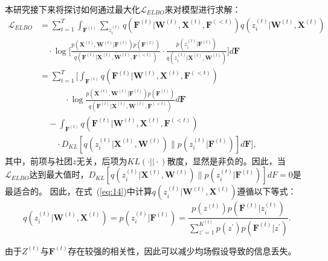 本研究接下来将探讨如何通过最大化$\mathcal{L}_{ELBO}$来对模型进行求解：
\begin{align}
 {\mathcal{L}_{ELBO}} & = \sum_{t=1}^T \int_{\bm{F}^{(t)}} \sum_{z_i^{(t)}} q(\bm{F}^{(t)}|\bm{W}^{(t)},\bm{X}^{(t)},\bm{F}^{(<t)})q(z_i^{(t)}|\bm{W}^{(t)},\bm{X}^{(t)}) \nonumber \\
 & \quad \cdot\log\Bigg[\frac{p(\bm{X}^{(t)}, \bm{W}^{(t)} | \bm{F}^{(t)}) p(\bm{F}^{(t)})}{q(\bm{F}^{(t)}|\bm{X}^{(t)},\bm{W}^{(t)}, \bm{F}^{(< t)})} \cdot\frac{p(z_i^{(t)}|\bm{F}^{(t)})}{q(z_i^{(t)}|\bm{X}^{(t)},\bm{W}^{(t)})} \Bigg]d\bm{F}\nonumber\\
 & = \sum_{t=1}^T \Bigg[\int_{\bm{F}^{(t)}}q(\bm{F}^{(t)}|\bm{W}^{(t)},\bm{X}^{(t)},\bm{F}^{(< t)}) \nonumber \\ 
 & \quad \quad \quad \cdot \log\frac{p(\bm{X}^{(t)}, \bm{W}^{(t)} | \bm{F}^{(t)}) p(\bm{F}^{(t)})}{q(\bm{F}^{(t)}|\bm{X}^{(t)},\bm{W}^{(t)}, \bm{F}^{(< t)})} d\bm{F} \nonumber \\
 & \quad - \int_{\bm{F}^{(t)}} q(\bm{F}^{(t)}|\bm{W}^{(t)},\bm{X}^{(t)},\bm{F}^{(< t)}) \nonumber\\
 & \quad \quad \cdot D_{KL}\left[q(z_i^{(t)}|\bm{X}^{(t)},\bm{W}^{(t)}) \parallel p(z_i^{(t)}|\bm{F}^{(t)})\right] d\bm{F} \Bigg],
\end{align}
其中，前项与社团$z$无关，后项为$KL(\cdot || \cdot)$散度，显然是非负的。因此，当$\mathcal{L}_{ELBO}$达到最大值时，$D_{KL}\left[q(z_i^{(t)}|\bm{X}^{(t)},\bm{W}^{(t)}) \parallel p(z_i^{(t)}|\bm{F}^{(t)})\right] dF =0$是最适合的。 
因此，在式~(\ref{eq:14})中计算$q(z_i^{(t)}|\bm{W}^{(t)},\bm{X}^{(t)})$遵循以下等式：
\begin{equation}
    q(z_i^{(t)}|\bm{W}^{(t)},\bm{X}^{(t)}) = p(z_i^{(t)}|\bm{F}^{(t)}) =\frac{p(z^{(t)})p(\bm{F}^{(t)}|z_i^{(t)})}{\sum_{z^{'}=1}^{K^{(t)}} p(z^{'})p(\bm{F}^{(t)}|z^{'})}.
\end{equation}

由于$Z^{(t)}$与$\bm{F}^{(t)}$存在较强的相关性，因此可以减少均场假设导致的信息丢失。



